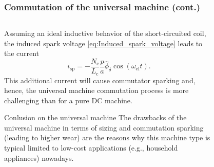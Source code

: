 \begin{frame}
	\frametitle{Commutation of the universal machine (cont.)}
	\begin{columns}
		\begin{column}{0.65\textwidth}
		Assuming an ideal inductive behavior of the short-circuited coil, the induced spark voltage \eqref{eq:Induced_spark_voltage} leads to the current
		\begin{equation}
			i_\mathrm{sp} = -\frac{N_\mathrm{c} }{L_\mathrm{c} } \frac{p}{a} \hat{\phi}_\delta \cos(\omega_\mathrm{el} t).
		\end{equation}
		This additional current will cause commutator sparking and, hence, the universal machine commutation process is more challenging than for a pure DC machine. 
		\vspace{-0.25cm}
		\begin{varblock}{Conlusion on the universal machine}
			The drawbacks of the universal machine in terms of sizing and commutation sparking (leading to higher wear) are the reasons why this machine type is typical limited to low-cost applications (e.g., household appliances) nowadays. 
		\end{varblock}
\end{column}
\hfill
\begin{column}{0.35\textwidth}
	\begin{figure}
		\centering
		\includegraphics[scale=1]{fig/lec03/Commutation_universal_machine.pdf}
\end{figure}
\end{column}
\end{columns}
\end{frame}